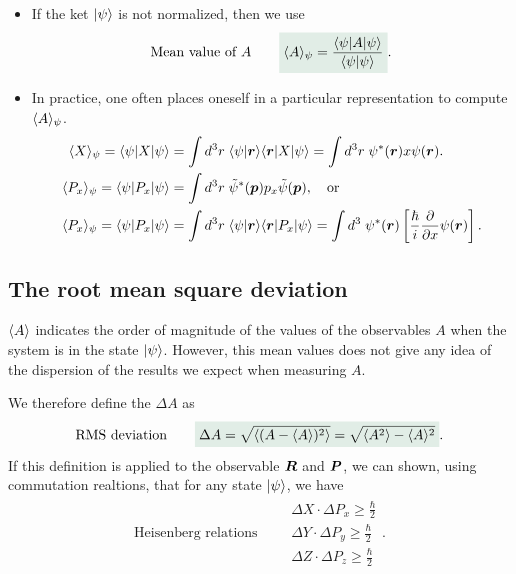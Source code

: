 \begin{itemize}[itemsep=0pt,topsep=0pt]
    \item If the ket $|\psi\rangle$ is not normalized, then we use 
    \begin{align}
        \text{Mean value of $A$}\qquad\highlight{\braket{A}_\psi=\frac{\braket{\psi|A|\psi}}{\braket{\psi|\psi}}}.
    \end{align}
    \item In practice, one often places oneself in a particular representation to compute $\langle A\rangle_\psi$.
    \begin{align*}
        \langle X\rangle_\psi=\langle\psi|X|\psi\rangle&=\int d^3r\;\langle\psi|\bm{r}\rangle\langle\bm{r}|X|\psi\rangle=\int d^3r\;\psi^*(\bm{r})x\psi(\bm{r}).\\
        \langle P_x\rangle_\psi=\langle\psi|P_x|\psi\rangle&=\int d^3r\;\tilde{\psi}^*(\bm{p})p_x\tilde{\psi}(\bm{p}),\quad\text{or}\\
        \langle P_x\rangle_\psi=\langle\psi|P_x|\psi\rangle&=\int d^3r\;\langle\psi|\bm{r}\rangle\langle\bm{r}|P_x|\psi\rangle=\int d^3\;\psi^*(\bm{r})\left[\frac{\hbar}{i}\frac{\partial}{\partial x}\psi(\bm{r})\right].
    \end{align*}
\end{itemize}


\subsection{The root mean square deviation}
$\langle A\rangle$ indicates the order of magnitude of the values of the observables $A$ when the system is in the state $|\psi\rangle$.
However, this mean values does not give any idea of the dispersion of the results we expect when measuring $A$.

We therefore define the  $\Delta A$ as 
\begin{align}
    \text{RMS deviation}\qquad\highlight{\Delta A=\sqrt{\braket{(A-\braket{A})^2}}=\sqrt{\braket{A^2}-\braket{A}^2}}.
\end{align}
If this definition is applied to the observable $\bm{R}$ and $\bm{P}$, we can shown, using commutation realtions, that for any state $|\psi\rangle$,
we have 
\begin{align}
    \text{Heisenberg relations}\qquad\begin{array}{l}
    \Delta X\cdot\Delta P_x\geq\frac{\hbar}{2}\\
    \Delta Y\cdot\Delta P_y\geq\frac{\hbar}{2}\\
    \Delta Z\cdot\Delta P_z\geq\frac{\hbar}{2}
    \end{array}.
\end{align}

